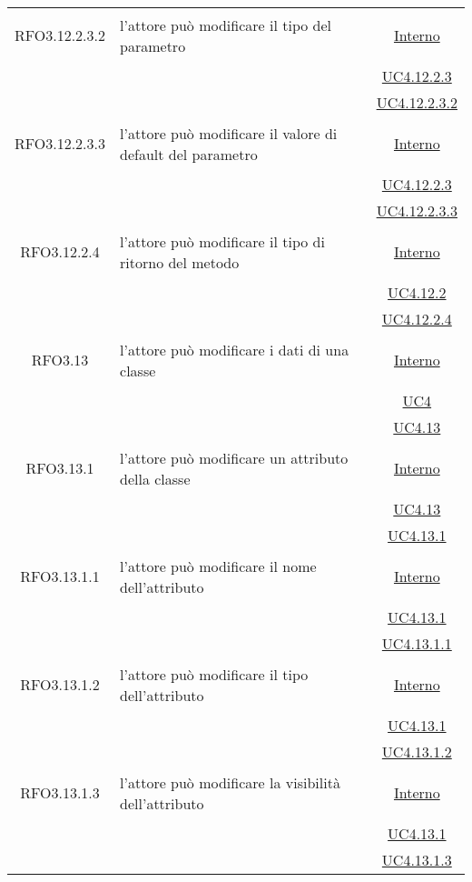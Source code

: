 \begin{longtable}{|c|>{\centering}m{7cm}|c|}
\hypertarget{RFO3.12.2.3.2}{RFO3.12.2.3.2} & l'attore può modificare il tipo del parametro & \hyperlink{Interno}{Interno}\\
& &\hyperref[UC4.12.2.3]{UC4.12.2.3}\\
& &\hyperref[UC4.12.2.3.2]{UC4.12.2.3.2}\\ \hline

\hypertarget{RFO3.12.2.3.3}{RFO3.12.2.3.3} & l'attore può modificare il valore di default del parametro & \hyperlink{Interno}{Interno}\\
& &\hyperref[UC4.12.2.3]{UC4.12.2.3}\\
& &\hyperref[UC4.12.2.3.3]{UC4.12.2.3.3}\\ \hline

\hypertarget{RFO3.12.2.4}{RFO3.12.2.4} & l'attore può modificare il tipo di ritorno del metodo & \hyperlink{Interno}{Interno}\\
& &\hyperref[UC4.12.2]{UC4.12.2}\\
& &\hyperref[UC4.12.2.4]{UC4.12.2.4}\\ \hline

\hypertarget{RFO3.13}{RFO3.13} & l'attore può modificare i dati di una classe & \hyperlink{Interno}{Interno}\\
& &\hyperref[UC4]{UC4}\\
& &\hyperref[UC4.13]{UC4.13}\\ \hline

\hypertarget{RFO3.13.1}{RFO3.13.1} & l'attore può modificare un attributo della classe & \hyperlink{Interno}{Interno}\\
& &\hyperref[UC4.13]{UC4.13}\\
& &\hyperref[UC4.13.1]{UC4.13.1}\\ \hline

\hypertarget{RFO3.13.1.1}{RFO3.13.1.1} & l'attore può modificare il nome dell'attributo & \hyperlink{Interno}{Interno}\\
& &\hyperref[UC4.13.1]{UC4.13.1}\\
& &\hyperref[UC4.13.1.1]{UC4.13.1.1}\\ \hline

\hypertarget{RFO3.13.1.2}{RFO3.13.1.2} & l'attore può modificare il tipo dell'attributo & \hyperlink{Interno}{Interno}\\
& &\hyperref[UC4.13.1]{UC4.13.1}\\
& &\hyperref[UC4.13.1.2]{UC4.13.1.2}\\ \hline

\hypertarget{RFO3.13.1.3}{RFO3.13.1.3} & l'attore può modificare la visibilità dell'attributo & \hyperlink{Interno}{Interno}\\
& &\hyperref[UC4.13.1]{UC4.13.1}\\
& &\hyperref[UC4.13.1.3]{UC4.13.1.3}\\ \hline


\end{longtable}
